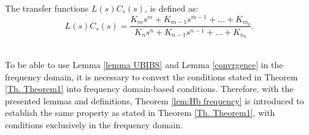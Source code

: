 \begin{definition}
    \label{eq: LCs}
    The transfer functions $L(s)C_s(s)$, is defined as:
\begin{equation}
\label{eq: L(s)Cs}
     L(s)C_s(s)=\frac{K_{m} s^{m} + K_{m-1} s^{m-1} + \ldots + K_{m_0}}{K_{n} s^{n} + K_{n-1} s^{n-1} + \ldots + K_{n_0}}.
\end{equation}\\
\end{definition}
\begin{comment}
\begin{definition}
    \label{eq: LCs}
    Transfer functions $C_s(s)$ and $L(s)C_s(s)$, are defined as:
    \begin{equation}
\label{eq:C_s}
    C_s(s) = \frac{K_{m'} s^{m'} + K_{m'-1} s^{m'-1} + \ldots + K_{m'_0}}{K_{n'} s^{n'} + K_{n'-1} s^{n'-1} + \ldots + 1},
\end{equation}
and,
\begin{equation}
     L(s)C_s(s)=\frac{K_{m} s^{m} + K_{m-1} s^{m-1} + \ldots + K_{m_0}}{K_{n} s^{n} + K_{n-1} s^{n-1} + \ldots + 1}.
\end{equation}\\
\end{definition}
\end{comment}
To be able to use Lemma \ref{lemma UBIBS} and Lemma \ref{convrgence} in the frequency domain, it is necessary to convert the conditions stated in Theorem \ref{Th. Theorem1} into frequency domain-based conditions. Therefore, with the presented lemmas and definitions, Theorem \ref{lem:Hb frequency} is introduced to establish the same property as stated in Theorem \ref{Th. Theorem1}, with conditions exclusively in the frequency domain.\\

